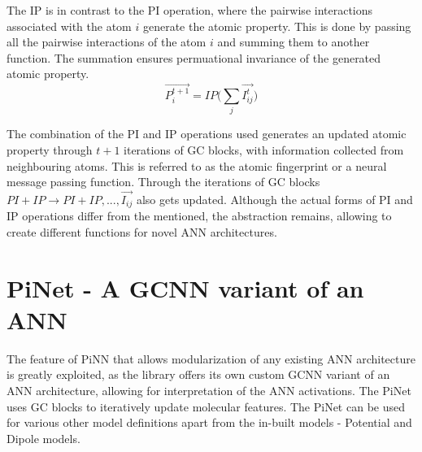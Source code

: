 \documentclass[11pt,a4paper]{report}
\begin{document}
{The IP is in contrast to the PI operation, where the pairwise interactions associated with the atom $i$ generate the atomic property. This is done by passing all the pairwise interactions of the atom $i$ and summing them to another function. The summation ensures permuational invariance of the generated atomic property.
\begin{equation} \label{IP}
\vec{P_i^{t+1}}=IP\bigg(\sum_{j}{\vec{I_{ij}^t}}\bigg)
\end{equation}

The combination of the PI and IP operations used generates an updated atomic property through $t+1$ iterations of GC blocks, with information collected from neighbouring atoms. This is referred to as the atomic fingerprint or a neural message passing function\cite{msg}. Through the iterations of GC blocks $PI+IP \rightarrow PI+IP,..., \vec{I_{ij}}$ also gets updated. Although the actual forms of PI and IP operations differ from the mentioned, the abstraction remains, allowing to create different functions for novel ANN architectures.

\section{PiNet - A GCNN variant of an ANN}
The feature of PiNN that allows modularization of any existing ANN architecture is greatly exploited, as the library offers its own custom GCNN variant of an ANN architecture, allowing for interpretation of the ANN activations. The PiNet\cite{PiNN} uses GC blocks to iteratively update molecular features. The PiNet can be used for various other model definitions apart from the in-built models - Potential and Dipole models.

}
\end{document}
